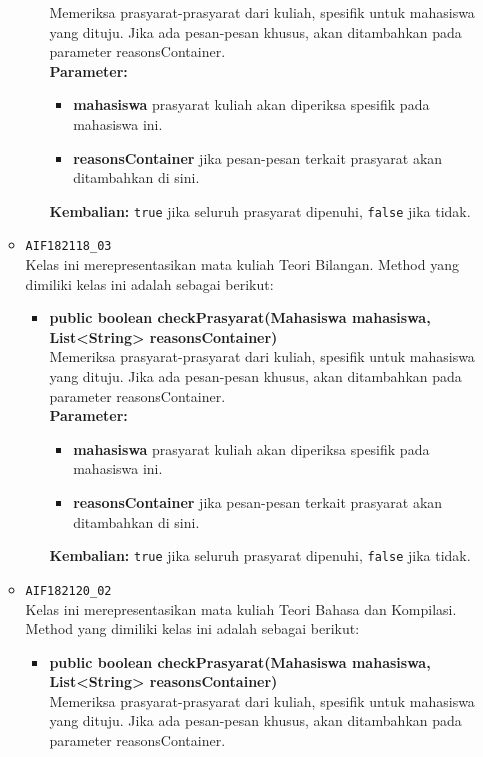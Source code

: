 \begin{enumerate}
\begin{itemize}
\begin{itemize}
			Memeriksa prasyarat-prasyarat dari kuliah, spesifik untuk mahasiswa yang dituju. Jika ada pesan-pesan khusus, akan ditambahkan pada parameter reasonsContainer.\\
			\textbf{Parameter:}
			\begin{itemize}
				\item \textbf{mahasiswa} prasyarat kuliah akan diperiksa spesifik pada mahasiswa ini.
				\item \textbf{reasonsContainer} jika pesan-pesan terkait prasyarat akan ditambahkan di sini.
			\end{itemize}
			\textbf{Kembalian:} \texttt{true} jika seluruh prasyarat dipenuhi, \texttt{false} jika tidak.
		\end{itemize}
		\item \texttt{AIF182118\_03} \\
		Kelas ini merepresentasikan mata kuliah Teori Bilangan. Method yang dimiliki kelas ini adalah sebagai berikut: 
		\begin{itemize}
			\item \textbf{public boolean checkPrasyarat(Mahasiswa mahasiswa, List<String> reasonsContainer)}\\
			Memeriksa prasyarat-prasyarat dari kuliah, spesifik untuk mahasiswa yang dituju. Jika ada pesan-pesan khusus, akan ditambahkan pada parameter reasonsContainer.\\
			\textbf{Parameter:}
			\begin{itemize}
				\item \textbf{mahasiswa} prasyarat kuliah akan diperiksa spesifik pada mahasiswa ini.
				\item \textbf{reasonsContainer} jika pesan-pesan terkait prasyarat akan ditambahkan di sini.
			\end{itemize}
			\textbf{Kembalian:} \texttt{true} jika seluruh prasyarat dipenuhi, \texttt{false} jika tidak.
		\end{itemize}
		\item \texttt{AIF182120\_02} \\
		Kelas ini merepresentasikan mata kuliah Teori Bahasa dan Kompilasi. Method yang dimiliki kelas ini adalah sebagai berikut: 
		\begin{itemize}
			\item \textbf{public boolean checkPrasyarat(Mahasiswa mahasiswa, List<String> reasonsContainer)}\\
			Memeriksa prasyarat-prasyarat dari kuliah, spesifik untuk mahasiswa yang dituju. Jika ada pesan-pesan khusus, akan ditambahkan pada parameter reasonsContainer.\\

\end{itemize}
\end{itemize}
\end{enumerate}
